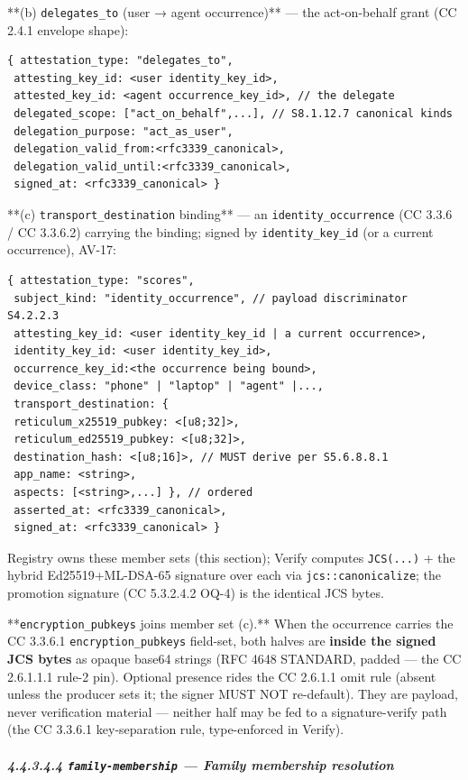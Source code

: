 \documentclass[11pt]{article}
\begin{document}
**(b) \texttt{delegates\_to} (user → agent occurrence)** — the act-on-behalf grant (CC 2.4.1 envelope shape):

\begin{lstlisting}
{ attestation_type: "delegates_to",
 attesting_key_id: <user identity_key_id>,
 attested_key_id: <agent occurrence_key_id>, // the delegate
 delegated_scope: ["act_on_behalf",...], // S8.1.12.7 canonical kinds
 delegation_purpose: "act_as_user",
 delegation_valid_from:<rfc3339_canonical>,
 delegation_valid_until:<rfc3339_canonical>,
 signed_at: <rfc3339_canonical> }
\end{lstlisting}

**(c) \texttt{transport\_destination} binding** — an \texttt{identity\_occurrence} (CC 3.3.6 / CC 3.3.6.2) carrying the binding; signed by \texttt{identity\_key\_id} (or a current occurrence), AV-17:

\begin{lstlisting}
{ attestation_type: "scores",
 subject_kind: "identity_occurrence", // payload discriminator S4.2.2.3
 attesting_key_id: <user identity_key_id | a current occurrence>,
 identity_key_id: <user identity_key_id>,
 occurrence_key_id:<the occurrence being bound>,
 device_class: "phone" | "laptop" | "agent" |...,
 transport_destination: {
 reticulum_x25519_pubkey: <[u8;32]>,
 reticulum_ed25519_pubkey: <[u8;32]>,
 destination_hash: <[u8;16]>, // MUST derive per S5.6.8.8.1
 app_name: <string>,
 aspects: [<string>,...] }, // ordered
 asserted_at: <rfc3339_canonical>,
 signed_at: <rfc3339_canonical> }
\end{lstlisting}

Registry owns these member sets (this section); Verify computes \texttt{JCS(...)} + the hybrid Ed25519+ML-DSA-65 signature over each via \texttt{jcs::canonicalize}; the promotion signature (CC 5.3.2.4.2 OQ-4) is the identical JCS bytes.


**\texttt{encryption\_pubkeys} joins member set (c).** When the occurrence carries the CC 3.3.6.1 \texttt{encryption\_pubkeys} field-set, both halves are \textbf{inside the signed JCS bytes} as opaque base64 strings (RFC 4648 STANDARD, padded — the CC 2.6.1.1.1 rule-2 pin). Optional presence rides the CC 2.6.1.1 omit rule (absent unless the producer sets it; the signer MUST NOT re-default). They are payload, never verification material — neither half may be fed to a signature-verify path (the CC 3.3.6.1 key-separation rule, type-enforced in Verify).


\subparagraph{4.4.3.4.4 \texttt{family-membership} — Family membership resolution}\mbox{}\\
\end{document}
